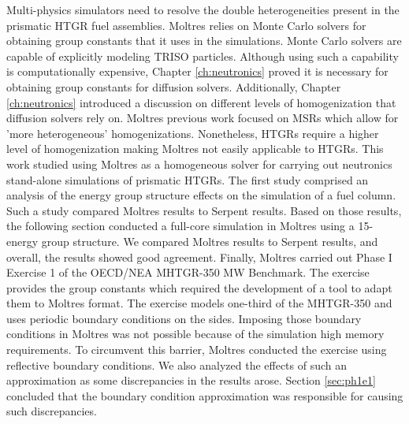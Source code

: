 Multi-physics simulators need to resolve the double heterogeneities present in the prismatic HTGR fuel assemblies.
Moltres relies on Monte Carlo solvers for obtaining group constants that it uses in the simulations.
Monte Carlo solvers are capable of explicitly modeling TRISO particles.
Although using such a capability is computationally expensive, Chapter \ref{ch:neutronics} proved it is necessary for obtaining group constants for diffusion solvers.
Additionally, Chapter \ref{ch:neutronics} introduced a discussion on different levels of homogenization that diffusion solvers rely on.
Moltres previous work focused on MSRs which allow for 'more heterogeneous' homogenizations.
Nonetheless, HTGRs require a higher level of homogenization making Moltres not easily applicable to HTGRs.
This work studied using Moltres as a homogeneous solver for carrying out neutronics stand-alone simulations of prismatic HTGRs.
The first study comprised an analysis of the energy group structure effects on the simulation of a fuel column.
Such a study compared Moltres results to Serpent results.
Based on those results, the following section conducted a full-core simulation in Moltres using a 15-energy group structure.
We compared Moltres results to Serpent results, and overall, the results showed good agreement.
Finally, Moltres carried out Phase I Exercise 1 of the OECD/NEA MHTGR-350 MW Benchmark.
The exercise provides the group constants which required the development of a tool to adapt them to Moltres format.
The exercise models one-third of the MHTGR-350 and uses periodic boundary conditions on the sides.
Imposing those boundary conditions in Moltres was not possible because of the simulation high memory requirements.
To circumvent this barrier, Moltres conducted the exercise using reflective boundary conditions.
We also analyzed the effects of such an approximation as some discrepancies in the results arose.
Section \ref{sec:ph1e1} concluded that the boundary condition approximation was responsible for causing such discrepancies.

